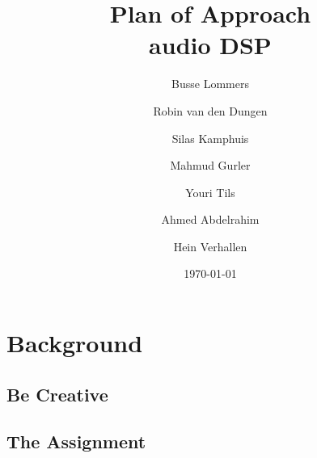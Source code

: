 \documentclass[*]{report}
\begin{document}
\title{Plan of Approach \\ \large audio DSP}
\author{Busse Lommers \and Robin van den Dungen \and Silas Kamphuis \and Mahmud Gurler \and Youri Tils \and Ahmed Abdelrahim \and Hein Verhallen}
\date{\today}
\maketitle
\tableofcontents

\chapter{Background}

\section{Be Creative}

\section{The Assignment}
\end{document}
